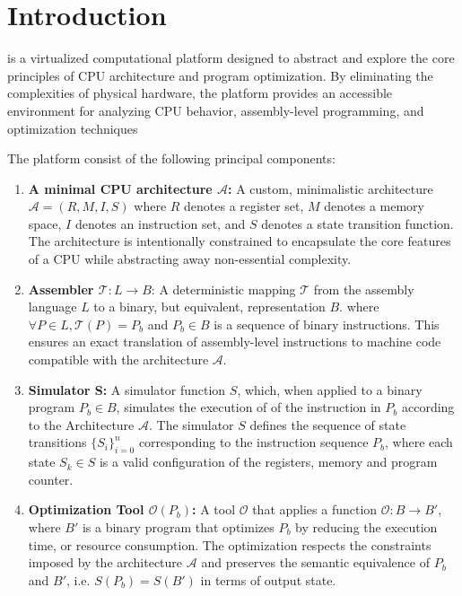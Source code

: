 \section{ Introduction }
\label{sec:Introduction}

\simulator{} is a virtualized computational platform designed to abstract
and explore the core principles of CPU architecture and program optimization.
By eliminating the complexities of physical hardware, the platform provides
an accessible environment for analyzing CPU behavior, assembly-level programming,
and optimization techniques

\vspace{1em}

\noindent The \simulator{} platform consist of the following principal
components:

\begin{enumerate}
  \item \textbf{A minimal CPU architecture $\mathcal{A}$:} A custom, minimalistic architecture $\mathcal{A} = (R, M, I, S)$
    where $R$ denotes a register set, $M$ denotes a memory space, $I$ denotes an instruction 
    set, and $S$ denotes a state transition function. The architecture is intentionally 
    constrained to encapsulate the core features of a CPU while abstracting away non-essential
    complexity. 
  \item \textbf{Assembler $\mathcal{T} : L \rightarrow B$}: A deterministic mapping $\mathcal{T}$ from the 
    assembly language $L$ to a binary, but equivalent, representation $B$. where $\forall P \in L, \mathcal{T}(P) = P_{b}$ 
    and $P_{b} \in B$ is a sequence of binary instructions. This ensures an exact translation of assembly-level
    instructions to machine code compatible with the architecture $\mathcal{A}$.
  \item \textbf{Simulator S:} A simulator function $S$, which, when applied to a binary program $P_{b} \in B$,
    simulates the execution of of the instruction in $P_{b}$ according to the Architecture $\mathcal{A}$. The simulator $S$ defines 
    the sequence of state transitions $\{S_i\}_{i = 0}^{n}$ corresponding to the instruction sequence $P_b$, where each
    state $S_k \in S$ is a valid configuration of the registers, memory and program counter.
  \item \textbf{Optimization Tool $\mathcal{O}(P_{b})$:} A tool $\mathcal{O}$ that applies a 
    function $\mathcal{O} : B \rightarrow B'$, where $B'$ is a binary program that optimizes $P_{b}$ by reducing
    the execution time, or resource consumption. The optimization respects the constraints imposed 
    by the architecture $\mathcal{A}$ and preserves the semantic equivalence of $P_{b}$ and 
    $B'$, i.e. $S(P_{b}) = S(B')$ in terms of output state.
\end{enumerate}

